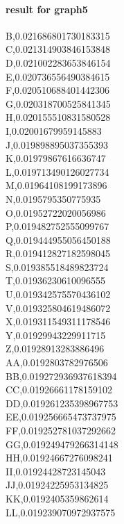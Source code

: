 \documentclass{article}
\begin{document}
        \newpage
        \newpage

          \paragraph{result for graph5}

B,0.021686801730183315\\
C,0.021314903846153848\\
D,0.021002283653846154\\
E,0.020736556490384615\\
F,0.020510688401442306\\
G,0.020318700525841345\\
H,0.020155510831580528\\
I,0.02001679959145883\\
J,0.019898895037355393\\
K,0.01979867616636747\\
L,0.019713490126027734\\
M,0.01964108199173896\\
N,0.0195795350775935\\
O,0.01952722020056986\\
P,0.019482752555099767\\
Q,0.019444955056450188\\
R,0.019412827182598045\\
S,0.019385518489823724\\
T,0.01936230610096555\\
U,0.019342575570436102\\
V,0.019325804619486072\\
X,0.019311549311178546\\
Y,0.01929943229911715\\
Z,0.01928913283886496\\
AA,0.0192803782976506\\
BB,0.019272936937618394\\
CC,0.01926661178159102\\
DD,0.019261235398967753\\
EE,0.019256665473737975\\
FF,0.019252781037292662\\
GG,0.019249479266314148\\
HH,0.01924667276098241\\
II,0.01924428723145043\\
JJ,0.01924225953134825\\
KK,0.0192405359862614\\
LL,0.019239070972937575\\
\end{document}
